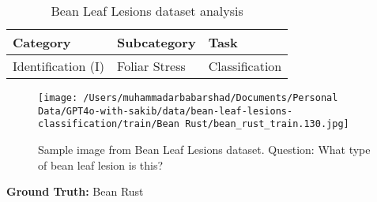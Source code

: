 
    \begin{table}
    \caption{Bean Leaf Lesions dataset analysis}
    \label{table:bean_leaf_lesions}
    \centering
    \begin{tabular}{lll}
        \toprule
        \textbf{Category} & \textbf{Subcategory} & \textbf{Task} \\
        \midrule
        Identification (I) & Foliar Stress & Classification \\
        \bottomrule
    \end{tabular}
    \end{table}

    \begin{figure}
    \centering
    \texttt{[image: /Users/muhammadarbabarshad/Documents/Personal Data/GPT4o-with-sakib/data/bean-leaf-lesions-classification/train/Bean Rust/bean\_rust\_train.130.jpg]}
    \caption{Sample image from Bean Leaf Lesions dataset. Question: What type of bean leaf lesion is this?}
    \label{fig:bean_leaf_lesions}
    \end{figure}

    \textbf{Ground Truth:} Bean Rust

